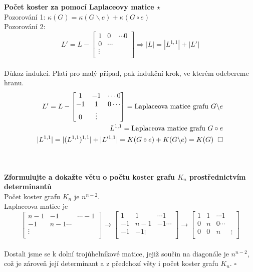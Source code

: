 \documentclass[a4paper]{article}
\newcommand{\qed}{\hspace{0.2cm}\square}
\newcommand{\led}{\hspace{0.2cm}$\square$}
\newcommand{\hlava}[1]{\text{} \\ \text{} \\ \text{} \hspace{-0.27cm} \textbf{#1} \\}
\begin{document}
\hlava{Počet koster za pomocí Laplaceovy matice $\star$}
Pozorování 1: $\kappa(G) = \kappa(G\backslash e) + \kappa(G \circ e)$ \\
Pozorování 2: \[L'= L-\begin{bmatrix} 
1 & 0 & \cdots 0 \\
0 & \cdots \\
\vdots \\
\end{bmatrix} \Rightarrow |L| = |L^{1,1}| + |L'| \] \\
Důkaz indukcí. Platí pro malý případ, pak indukční krok, ve kterém odebereme hranu.
\begin{align*}
L'=L-\begin{bmatrix} 
1 & -1 & \cdots 0 \\
-1 & 1 & 0 \cdots \\
0 & \vdots \\
\end{bmatrix} = \text{Laplaceova matice grafu } G \backslash e\\
L^{1,1} = \text{Laplaceova matice grafu } G \circ e\\
|L^{1,1}| = |(L^{1,1})^{1,1}| + |L'^{1,1}| = K(G\circ e) + K(G \backslash e) = K(G) \qed
\end{align*}

\hlava{Zformulujte a dokažte větu o počtu koster grafu $K_n$ prostřednictvím determinantů}
Počet koster grafu $K_n$ je $n^{n-2}$. \\
Laplaceova matice je \[\begin{bmatrix} 
n-1 & -1 & \cdots -1 \\
-1 & n-1 \cdots \\
\vdots \\
\end{bmatrix} \rightarrow \begin{bmatrix} 
1 & 1 & \cdots 1 \\
-1 & n-1 & -1\cdots \\
-1 & -1 \vdots \\
\end{bmatrix} 
\rightarrow \begin{bmatrix} 
	1 & 1 & \cdots 1 \\
	0 & n & 0\cdots \\
	0 & 0 & n & \vdots \\
\end{bmatrix} \]\\
Dostali jsme se k dolní trojúhelníkové matice, jejiž součin na diagonále je $n^{n-2}$, což je zároveň její determinant a z předchozí věty i počet koster grafu $K_n$. \led
\end{document}
